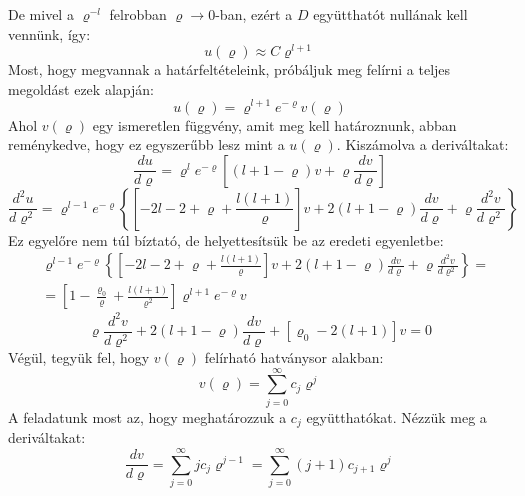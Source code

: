 \documentclass[../main.tex]{subfiles}
\begin{document}
De mivel a $\varrho^{-l}$ felrobban $\varrho \to 0$-ban, ezért a $D$ együtthatót nullának kell vennünk, így:
\begin{equation}
    u(\varrho) \approx C \varrho^{l + 1}
\end{equation}
Most, hogy megvannak a határfeltételeink, próbáljuk meg felírni a teljes megoldást ezek alapján:
\begin{equation}
    u(\varrho) = \varrho^{l + 1} e^{-\varrho} v(\varrho)
\end{equation}
Ahol $v(\varrho)$ egy ismeretlen függvény, amit meg kell határoznunk, abban reménykedve, hogy ez egyszerűbb lesz mint a $u(\varrho)$. Kiszámolva a deriváltakat:
\begin{equation}
   \frac{du}{d \varrho} = \varrho^{l} e^{-\varrho} \left[(l + 1 - \varrho)v + \varrho \frac{dv}{d \varrho}\right]
\end{equation}
\begin{equation}
   \frac{d^2 u}{d \varrho^2} = \varrho^{l - 1} e^{-\varrho} \left\{\left[-2l - 2 + \varrho + \frac{l(l+1)}{\varrho}\right]v + 2(l + 1 - \varrho) \frac{dv}{d \varrho} + \varrho \frac{d^2 v}{d \varrho^2}\right\}
\end{equation}
Ez egyelőre nem túl bíztató, de helyettesítsük be az eredeti egyenletbe:
\begin{equation}
    \begin{aligned}
        & \varrho^{l - 1} e^{-\varrho} \left\{\left[-2l - 2 + \varrho + \frac{l(l+1)}{\varrho}\right]v + 2(l + 1 - \varrho) \frac{dv}{d \varrho} + \varrho \frac{d^2 v}{d \varrho^2}\right\} = \\
        & = \left[1 - \frac{\varrho_0}{\varrho} + \frac{l(l + 1)}{\varrho^2}\right] \varrho^{l + 1} e^{-\varrho} v
    \end{aligned}
\end{equation}
\begin{equation}
   \varrho \frac{d^2 v}{d \varrho^2} + 2(l + 1 - \varrho) \frac{dv}{d \varrho} + [\varrho_0 - 2(l + 1)] v = 0
\end{equation}
Végül, tegyük fel, hogy $v(\varrho)$ felírható hatványsor alakban:
\begin{equation}
    v(\varrho) = \sum_{j=0}^{\infty} c_j \varrho^j
\end{equation}
A feladatunk most az, hogy meghatározzuk a $c_j$ együtthatókat. Nézzük meg a deriváltakat:
\begin{equation}
   \frac{dv}{d \varrho} = \sum_{j=0}^{\infty} j c_j \varrho^{j - 1} = \sum_{j=0}^{\infty} (j + 1) c_{j + 1} \varrho^{j}
\end{equation}
\end{document}
